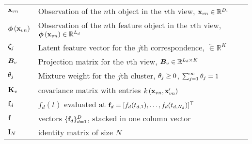 \begin{tabular}{m{3cm}m{12cm}}
	
	$\mathbf{x}_{vn}$ & Observation of the $n$th object in the $v$th view, $\mathbf{x}_{vn} \in \mathbb{R}^{D_v}$\\
	$\boldsymbol{\phi}\left(\mathbf{x}_{vn}\right)$ & Observation of the $n$th feature object in the $v$th view, $\boldsymbol{\phi}\left(\mathbf{x}_{vn}\right) \in \mathbb{R}^{L_d}$\\
	$\boldsymbol{\zeta}_j$& Latent feature vector for the $j$th correspondence, $\lvec \in \mathbb{R}^{K}$ \\
	$\bm{B}_v$& Projection matrix for the $v$th view, $\bm{B}_v \in \mathbb{R}^{L_d \times K}$ \\
	${\theta}_j$ & Mixture weight for the  $j$th cluster, ${\theta}_j \ge 0$, $\sum_{j=1}^{\infty}{{\theta}_j} = 1$\\
	
	$\mathbf{K}_v$ & covariance matrix with entries $k\left(\mathbf{x}_{vn},\mathbf{x}_{vn}^\prime\right)$ \\
	$\mathbf{f}_d$ & $f_d(t)$ evaluated at $\mathbf{f}_d = [f_d(t_{d,1}),\ldots,f_d(t_{d,N_d})]^{\top}$\\
	$\mathbf{f}$ & vectors $\{\mathbf{f}_d\}_{d=1}^{D}$, stacked in one column vector\\
	$\mathbf{I}_N$ & identity matrix of size $N$\\
\end{tabular}

